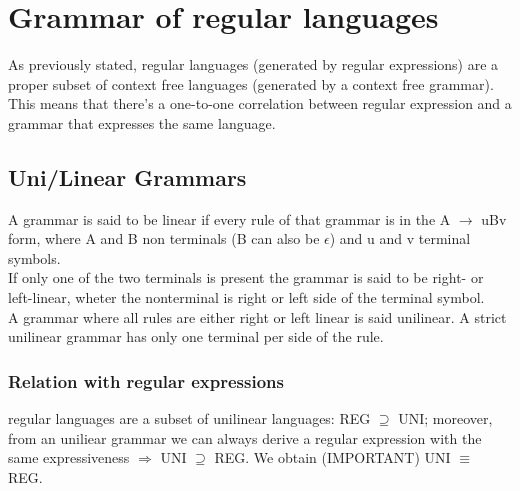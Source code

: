 	\section{Grammar of regular languages}
		As previously stated, regular languages (generated by regular expressions) are a proper subset of context free languages (generated by a context free grammar). This means that there's a one-to-one correlation between regular expression and a grammar that expresses the same language. 
		\subsection{Uni/Linear Grammars}
			A grammar is said to be linear if every rule of that grammar is in the A $\rightarrow$ uBv form, where A and B non terminals (B can also be $\epsilon$) and u and v terminal symbols.\\
			If only one of the two terminals is present the grammar is said to be right- or left-linear, wheter the nonterminal is right or left side of the terminal symbol.\\
			A grammar where all rules are either right or left linear is said unilinear. A strict unilinear grammar has only one terminal per side of the rule.\\
			\subsubsection{Relation with regular expressions} regular languages are a subset of unilinear languages: REG $\supseteq$ UNI; moreover, from an uniliear grammar we can always derive a regular expression with the same expressiveness $\Rightarrow$ UNI $\supseteq$ REG. We obtain (IMPORTANT) UNI $\equiv$ REG.